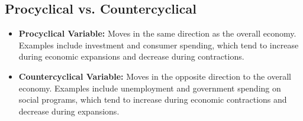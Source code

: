 \documentclass{article}
\begin{document}
\subsection{Procyclical vs. Countercyclical}
\begin{itemize}
    \item \textbf{Procyclical Variable:} Moves in the same direction as the overall economy. Examples include investment and consumer spending, which tend to increase during economic expansions and decrease during contractions.
    \item \textbf{Countercyclical Variable:} Moves in the opposite direction to the overall economy. Examples include unemployment and government spending on social programs, which tend to increase during economic contractions and decrease during expansions.
\end{itemize}
\end{document}
